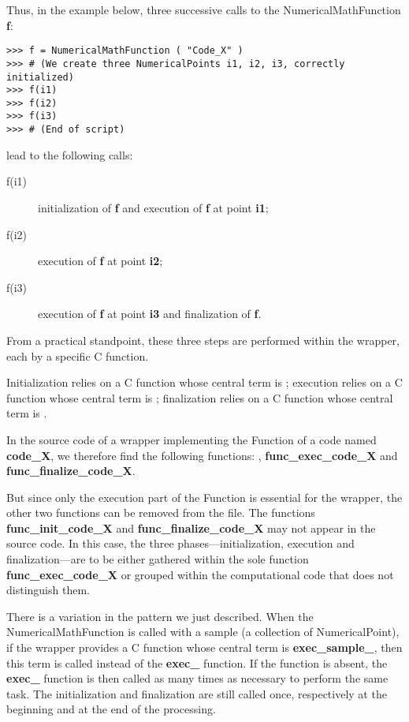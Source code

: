 Thus, in the example below, three successive calls to the NumericalMathFunction {\bf f}:
\lstset{language=C++, basicstyle=\normalsize}
\begin{lstlisting}[frame=TBRL]
>>> f = NumericalMathFunction ( "Code_X" )
>>> # (We create three NumericalPoints i1, i2, i3, correctly initialized)
>>> f(i1)
>>> f(i2)
>>> f(i3)
>>> # (End of script)
\end{lstlisting}

lead to the following calls:
\begin{description}
\item[f(i1)] initialization of {\bf f} and execution of {\bf f} at point {\bf i1};
\item[f(i2)] execution of {\bf f} at point {\bf i2};
\item[f(i3)] execution of {\bf f} at point {\bf i3} and finalization of {\bf f}.
\end{description}

From a practical standpoint, these three steps are performed within the wrapper, each by a specific C function.

Initialization relies on a C function whose central term is ; execution relies on a C function whose central term is ; finalization relies on a C function whose central term is .

In the source code of a wrapper implementing the Function of a code named {\bf code\_X}, we therefore find the following functions: , {\bf func\_exec\_code\_X} and {\bf func\_finalize\_code\_X}.

But since only the execution part of the Function is essential for the wrapper, the other two functions can be removed from the file. The functions {\bf func\_init\_code\_X} and {\bf func\_finalize\_code\_X} may not appear in the source code. In this case, the three phases---initialization, execution and finalization---are to be either gathered within the sole function {\bf func\_exec\_code\_X} or grouped within the computational code that does not distinguish them.

There is a variation in the pattern we just described. When the NumericalMathFunction is called with a sample (a collection of NumericalPoint), if the wrapper provides a C function whose central term is {\bf exec\_sample\_}, then this term is called instead of the {\bf exec\_} function. If the  function is absent, the {\bf exec\_} function is then called as many times as necessary to perform the same task. The initialization and finalization are still called once, respectively at the beginning and at the end of the processing.

